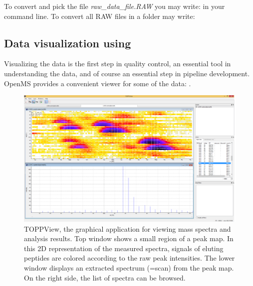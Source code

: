 To convert and pick the file \textit{raw\_data\_file.RAW} you may write:
\newline
{}
\newline
in your command line.
\newline
To convert all RAW files in a folder may write:
\newline
{}
\newline
{}



\subsection{Data visualization using }
\label{Data_Visualization}

Visualizing the data is the first step in quality control, an essential tool in understanding the data, and of course an essential step in pipeline development.
OpenMS provides a convenient viewer for some of the data: .

\begin{figure}
\includegraphics[width=\textwidth]{graphics/introduction/TOPPView.png}
\caption{TOPPView, the graphical application for viewing mass spectra and analysis results. Top window shows a small region of a peak map. In this 2D representation of the measured spectra, signals of eluting peptides are colored according to the raw peak intensities. The lower window displays an extracted spectrum (=scan) from the peak map. On the right side, the list of spectra can be browsed.}
\label{fig:toppview}
\end{figure}

